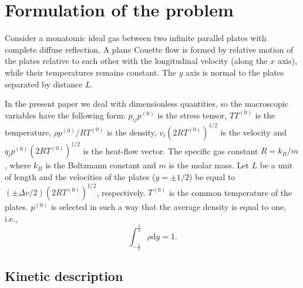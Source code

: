 \documentclass[]{jfm}
\newcommand{\dd}{\mathrm{d}}
\begin{document}
\section{Formulation of the problem}

Consider a monatomic ideal gas between two infinite parallel plates with complete diffuse reflection.
A plane Couette flow is formed by relative motion of the plates relative to each other
with the longitudinal velocity (along the \(x\) axis),
while their temperatures remains constant.
The \(y\) axis is normal to the plates separated by distance \(L\).

In the present paper we deal with dimensionless quantities, so the macroscopic variables
have the following form: \(p_{ij}p^{(0)}\) is the stress tensor, \(TT^{(0)}\) is the temperature,
\(\rho p^{(0)}/RT^{(0)}\) is the density, \(v_i(2RT^{(0)})^{1/2}\) is the velocity
and \(q_ip^{(0)}(2RT^{(0)})^{1/2}\) is the heat-flow vector.
The specific gas constant \(R = k_B/m\), where \(k_B\) is the Boltzmann constant
and \(m\) is the molar mass.
Let \(L\) be a unit of length and the velocities of the plates (\(y=\pm1/2\))
be equal to \((\pm\Delta{v}/2)(2RT^{(0)})^{1/2}\), respectively.
\(T^{(0)}\) is the common temperature of the plates.
\(p^{(0)}\) is selected in such a way that the average density is equal to one, i.e.,
\begin{equation}\label{eq:total_mass}
    \int_{-\frac12}^\frac12\rho\dd{y} = 1.
\end{equation}

\subsection{Kinetic description}
\end{document}
